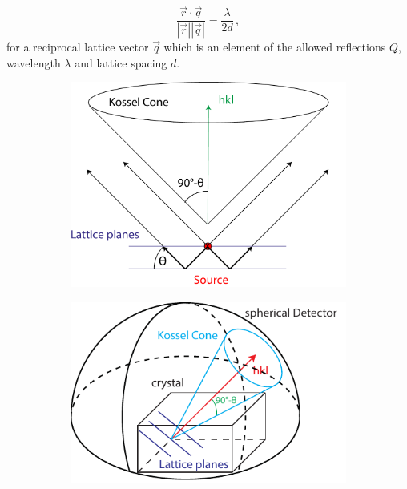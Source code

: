 \begin{equation}
\frac{\vec{r} \cdot \vec{q}}{\left|\vec{r}\right| \left| \vec{q}\right|} = \frac{\lambda}{2d} \,,
\end{equation}
 for a reciprocal lattice vector $\vec{q}$ which is an element of the allowed reflections $Q$, wavelength $\lambda$ and lattice spacing $d$.
\begin{figure}
	\centering
	\begin{subfigure}[b]{0.3\textwidth}
	\includegraphics[width=\linewidth]{images/kossel0.pdf}
	\end{subfigure}
	\begin{subfigure}[b]{0.3\textwidth}
	\includegraphics[width=\linewidth]{images/kossel.pdf}
	\end{subfigure}
	\begin{subfigure}[b]{0.35\textwidth}

\end{subfigure}
\end{figure}
